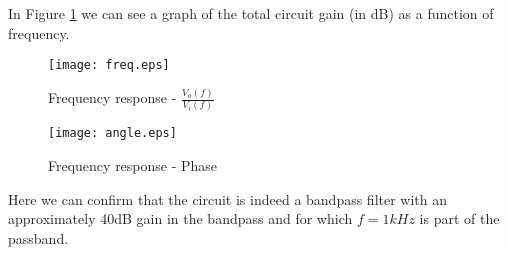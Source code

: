 In Figure \ref{fig:freq_response} we can see a graph of the total circuit gain (in dB) as a function of frequency.


\begin{figure}[H] \centering
\texttt{[image: freq.eps]}
\caption{Frequency response - $\frac{V_o(f)}{V_i(f)}$}
\label{fig:freq_response}
\end{figure}

\begin{figure}[H] \centering
\texttt{[image: angle.eps]}
\caption{Frequency response - Phase}
\label{fig:freq_response_phase}
\end{figure}

Here we can confirm that the circuit is indeed a bandpass filter with an approximately 40dB gain in the bandpass and for which $f = 1 kHz$ is part of the passband. 




